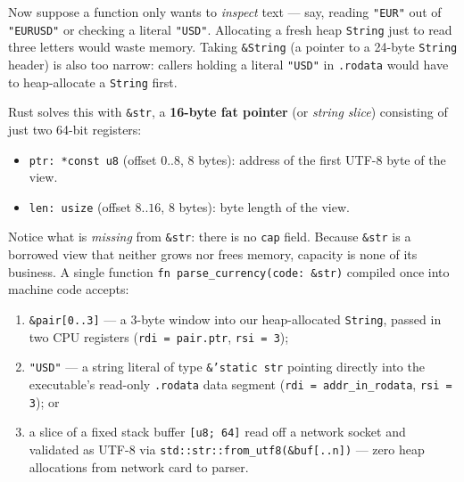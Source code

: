 Now suppose a function only wants to \emph{inspect} text --- say, reading \texttt{"EUR"} out of \texttt{"EURUSD"} or checking a literal \texttt{"USD"}. Allocating a fresh heap \texttt{String} just to read three letters would waste memory. Taking \texttt{\&String} (a pointer to a 24-byte \texttt{String} header) is also too narrow: callers holding a literal \texttt{"USD"} in \texttt{.rodata} would have to heap-allocate a \texttt{String} first.

Rust solves this with \texttt{\&str}, a \textbf{16-byte fat pointer} (or \emph{string slice}) consisting of just two 64-bit registers:
\begin{itemize}
  \item \texttt{ptr: *const u8} (offset $0..8$, 8 bytes): address of the first UTF-8 byte of the view.
  \item \texttt{len: usize} (offset $8..16$, 8 bytes): byte length of the view.
\end{itemize}
Notice what is \emph{missing} from \texttt{\&str}: there is no \texttt{cap} field. Because \texttt{\&str} is a borrowed view that neither grows nor frees memory, capacity is none of its business. A single function \texttt{fn parse\_currency(code: \&str)} compiled once into machine code accepts:
\begin{enumerate}
  \item \texttt{\&pair[0..3]} --- a 3-byte window into our heap-allocated \texttt{String}, passed in two CPU registers (\texttt{rdi = pair.ptr}, \texttt{rsi = 3});
  \item \texttt{"USD"} --- a string literal of type \texttt{\&'static str} pointing directly into the executable's read-only \texttt{.rodata} data segment (\texttt{rdi = addr\_in\_rodata}, \texttt{rsi = 3}); or
  \item a slice of a fixed stack buffer \texttt{[u8; 64]} read off a network socket and validated as UTF-8 via \texttt{std::str::from\_utf8(\&buf[..n])} --- zero heap allocations from network card to parser.
\end{enumerate}

